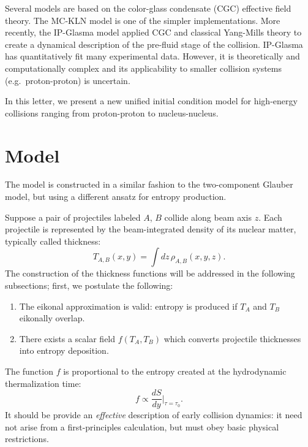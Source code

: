 \documentclass[aps,prl,reprint,amsmath,nofootinbib]{revtex4-1}
\begin{document}
Several models are based on the color-glass condensate (CGC) effective field theory.  The MC-KLN model is one
of the simpler implementations.  More recently, the IP-Glasma model applied CGC and classical Yang-Mills
theory to create a dynamical description of the pre-fluid stage of the collision.  IP-Glasma has
quantitatively fit many experimental data.  However, it is theoretically and computationally complex and its
applicability to smaller collision systems (e.g.~proton-proton) is uncertain.

In this letter, we present a new unified initial condition model for high-energy collisions ranging from
proton-proton to nucleus-nucleus.


\section{Model}

The model is constructed in a similar fashion to the two-component Glauber model, but using a different ansatz
for entropy production.

Suppose a pair of projectiles labeled $A$, $B$ collide along beam axis $z$.  Each projectile is represented by
the beam-integrated density of its nuclear matter, typically called thickness:
\begin{equation}
  T_{A,B}(x, y) = \int dz \, \rho_{A,B}(x, y, z).
\end{equation}
The construction of the thickness functions will be addressed in the following subsections; first, we
postulate the following:
\begin{enumerate}
  \item The eikonal approximation is valid:  entropy is produced if $T_A$ and $T_B$ eikonally overlap.
  \item There exists a scalar field $f(T_A, T_B)$ which converts projectile thicknesses into entropy
    deposition.
\end{enumerate}
The function $f$ is proportional to the entropy created at the hydrodynamic thermalization time:
\begin{equation}
  f \propto \frac{dS}{dy} \biggr|_{\tau = \tau_0}.
\end{equation}
It should be provide an \emph{effective} description of early collision dynamics:  it need not arise from a
first-principles calculation, but must obey basic physical restrictions.
\end{document}
